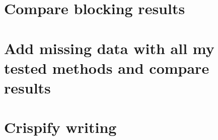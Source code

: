 \documentclass[12pt]{article}
\begin{document}
\section*{Compare blocking results}

\vspace{0.4cm}

\section*{Add missing data with all my tested methods and compare results}

\vspace{0.4cm}

\section*{Crispify writing}
\end{document}
